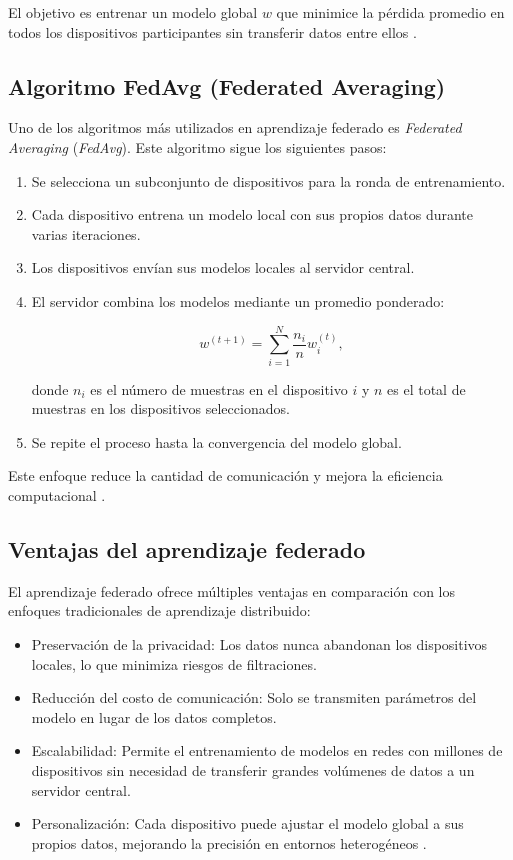 \begin{itemize}
		El objetivo es entrenar un modelo global \( w \) que minimice la pérdida promedio en todos los dispositivos participantes sin transferir datos entre ellos \cite{konevcny2016federated}.
		
		\subsection{Algoritmo FedAvg (Federated Averaging)}
		
		Uno de los algoritmos más utilizados en aprendizaje federado es \textit{Federated Averaging} (\textit{FedAvg}). Este algoritmo sigue los siguientes pasos:
		
		\begin{enumerate}
			\item Se selecciona un subconjunto de dispositivos para la ronda de entrenamiento.
			\item Cada dispositivo entrena un modelo local con sus propios datos durante varias iteraciones.
			\item Los dispositivos envían sus modelos locales al servidor central.
			\item El servidor combina los modelos mediante un promedio ponderado:
			
			\begin{equation}
				w^{(t+1)} = \sum_{i=1}^{N} \frac{n_i}{n} w_i^{(t)},
			\end{equation}
			
			donde \( n_i \) es el número de muestras en el dispositivo \( i \) y \( n \) es el total de muestras en los dispositivos seleccionados.
			\item Se repite el proceso hasta la convergencia del modelo global.
		\end{enumerate}
		
		Este enfoque reduce la cantidad de comunicación y mejora la eficiencia computacional \cite{mcmahan2017communication}.
		
		\subsection{Ventajas del aprendizaje federado}
		
		El aprendizaje federado ofrece múltiples ventajas en comparación con los enfoques tradicionales de aprendizaje distribuido:
		
		\begin{itemize}
			\item Preservación de la privacidad: Los datos nunca abandonan los dispositivos locales, lo que minimiza riesgos de filtraciones.
			\item Reducción del costo de comunicación: Solo se transmiten parámetros del modelo en lugar de los datos completos.
			\item Escalabilidad: Permite el entrenamiento de modelos en redes con millones de dispositivos sin necesidad de transferir grandes volúmenes de datos a un servidor central.
			\item Personalización: Cada dispositivo puede ajustar el modelo global a sus propios datos, mejorando la precisión en entornos heterogéneos \cite{li2020federated}.
		\end{itemize}
		

\end{itemize}
